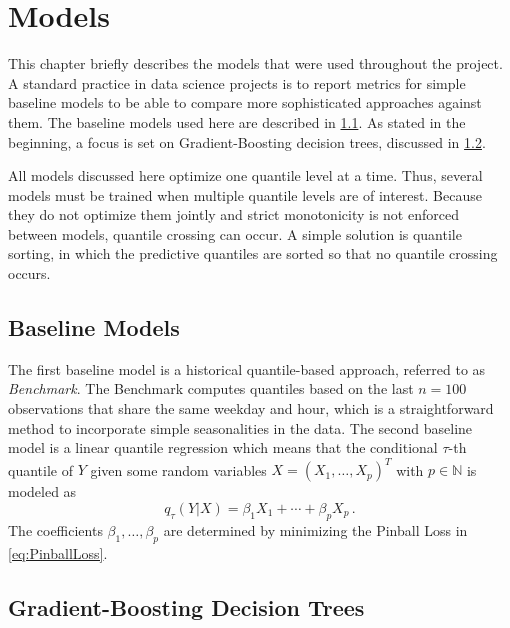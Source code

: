\newpage
\section{Models}
\label{ch:Models}

This chapter briefly describes the models that were used throughout the project. A standard practice in data science projects is to report metrics for simple baseline models to be able to compare more sophisticated approaches against them. The baseline models used here are described in \cref{sec:Models:Baselines}. As stated in the beginning, a focus is set on Gradient-Boosting decision trees, discussed in \cref{sec:Models:GBDT}.

All models discussed here optimize one quantile level at a time. Thus, several models must be trained when multiple quantile levels are of interest. Because they do not optimize them jointly and strict monotonicity is not enforced between models, quantile crossing can occur. A simple solution is quantile sorting, in which the predictive quantiles are sorted so that no quantile crossing occurs.

\subsection{Baseline Models}
\label{sec:Models:Baselines}

The first baseline model is a historical quantile-based approach, referred to as \textit{Benchmark}. The Benchmark computes quantiles based on the last $n = 100$ observations that share the same weekday and hour, which is a straightforward method to incorporate simple seasonalities in the data. The second baseline model is a linear quantile regression \parencite{koenker_regression_1978} which means that the conditional $\tau$-th quantile of $Y$ given some random variables $X = (X_1, \ldots, X_p)^T$ with $p \in \mathbb{N}$ is modeled as
\begin{equation}
    q_\tau(Y | X) = \beta_1 X_1 + \cdots + \beta_p X_p \, .
\end{equation}
The coefficients $\beta_1, \ldots, \beta_p$ are determined by minimizing the Pinball Loss in \cref{eq:PinballLoss}.

\subsection{Gradient-Boosting Decision Trees}
\label{sec:Models:GBDT}

